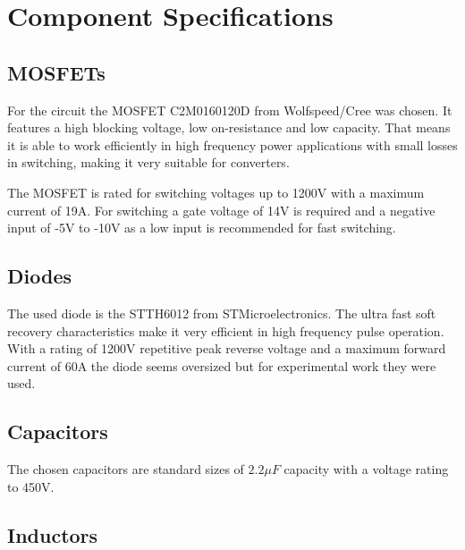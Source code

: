\section{Component Specifications}\label{ch:compSpec}

\subsection{MOSFETs}
For the circuit the MOSFET C2M0160120D from Wolfspeed/Cree was chosen. 
It features a high blocking voltage, low on-resistance and low capacity.
That means it is able to work efficiently in high frequency power applications with small losses in switching, making it very suitable for converters.

The MOSFET is rated for switching voltages up to 1200V with a maximum current of 19A.
For switching a gate voltage of 14V is required and a negative input of -5V to -10V as a low input is recommended for fast switching.

\subsection{Diodes}
The used diode is the STTH6012 from STMicroelectronics.
The ultra fast soft recovery characteristics make it very efficient in high frequency pulse operation.
With a rating of 1200V repetitive peak reverse voltage and a maximum forward current of 60A the diode seems oversized but for experimental work they were used.

\subsection{Capacitors}
The chosen capacitors are standard sizes of $2.2 \mu F$ capacity with a voltage rating to 450V.

\subsection{Inductors}
